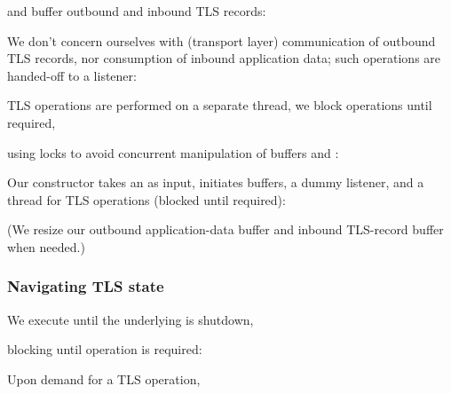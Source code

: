 \noindent
and buffer outbound and inbound TLS records:



\noindent
We don't concern ourselves with (transport layer) communication of outbound 
TLS records, nor consumption of inbound application data; such operations
are handed-off to a listener:



\noindent
TLS operations are performed on a separate thread, we block operations 
until required, 



\noindent
using locks to avoid concurrent manipulation of buffers  and :



\noindent
Our constructor takes an  as input, initiates buffers, a dummy listener,
and a thread for TLS operations (blocked until required):



\noindent
(We resize our outbound application-data buffer and inbound TLS-record buffer
when needed.) 


\subsubsection*{Navigating TLS state}

We execute until the underlying  is shutdown, 



\noindent
blocking until operation is required:



\noindent
Upon demand for a TLS operation,



